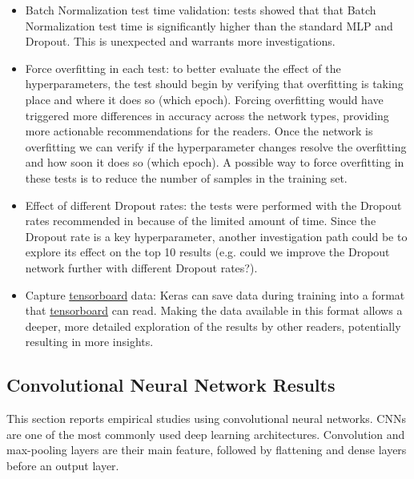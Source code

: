 \documentclass[../dropout-vs-batch-normalization.tex]{subfiles}
\begin{document}
\begin{itemize}
\item Batch Normalization test time validation: tests showed that that Batch Normalization test time is significantly higher than the standard MLP and Dropout. This is unexpected and warrants more investigations.
\item Force overfitting in each test: to better evaluate the effect of the hyperparameters, the test should begin by verifying that overfitting is taking place and where it does so (which epoch). Forcing overfitting would have triggered more differences in accuracy across the network types, providing more actionable recommendations for the readers. Once the network is overfitting we can verify if the hyperparameter changes resolve the overfitting and how soon it does so (which epoch). A possible way to force overfitting in these tests is to reduce the number of samples in the training set.
\item Effect of different Dropout rates: the tests were performed with the Dropout rates recommended in \cite{Srivastava2014} because of the limited amount of time. Since the Dropout rate is a key hyperparameter, another investigation path could be to explore its effect on the top 10 results (e.g. could we improve the Dropout network further with different Dropout rates?).
\item Capture \href{https://www.tensorflow.org/guide/summaries_and_tensorboard}{tensorboard} data: Keras can save data during training into a format that \href{https://www.tensorflow.org/guide/summaries_and_tensorboard}{tensorboard} can read. Making the data available in this format allows a deeper, more detailed exploration of the results by other readers, potentially resulting in more insights.
\end{itemize}







\subsection{Convolutional Neural Network Results}

This section reports empirical studies using convolutional neural networks. CNNs are one of the most commonly used deep learning architectures. Convolution and max-pooling layers are their main feature, followed by flattening and dense layers before an output layer.
\end{document}
